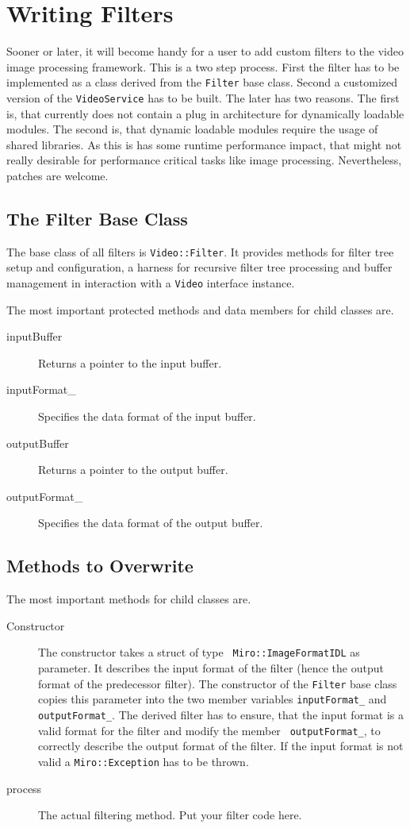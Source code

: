 \section{Writing Filters}

Sooner or later, it will become handy for a user to add 
custom filters to the video image processing framework. This is a two
step process. First the filter has to be implemented as a class
derived from the {\tt Filter} base class. Second a customized version
of the {\tt VideoService} has to be built. The later has two
reasons. The first is, that \miro currently does not contain a plug in
architecture for dynamically loadable modules. The second is, that
dynamic loadable modules require the usage of shared libraries. As
this is has some runtime performance impact, that might not really
desirable for performance critical tasks like image
processing. Nevertheless, patches are welcome.

\subsection{The Filter Base Class}

The base class of all filters is {\tt Video::Filter}. It provides
methods for filter tree setup and configuration, a harness for
recursive filter tree processing and buffer management in interaction
with a {\tt Video} interface instance.

The most important protected methods and data members for child classes are.
\begin{description}
\item[inputBuffer] Returns a pointer to the input buffer.
\item[inputFormat\_] Specifies the data format of the input buffer.
\item[outputBuffer] Returns a pointer to the output buffer.
\item[outputFormat\_] Specifies the data format of the output buffer.
\end{description}

\subsection{Methods to Overwrite}

The most important methods for child classes are.
\begin{description}
\item[Constructor] The constructor takes a struct of type {\tt
    Miro::ImageFormatIDL} as parameter. It describes the input format
  of the filter (hence the output format of the predecessor filter).
  The constructor of the {\tt Filter} base class copies this parameter
  into the two member variables {\tt inputFormat\_} and {\tt
    outputFormat\_}. The derived filter has to ensure, that the input
  format is a valid format for the filter and modify the member {\tt
    outputFormat\_}, to correctly describe the output format of the
  filter. If the input format is not valid a {\tt Miro::Exception} has
  to be thrown.
\item[process] The actual filtering method. Put your filter code here.
\end{description}


